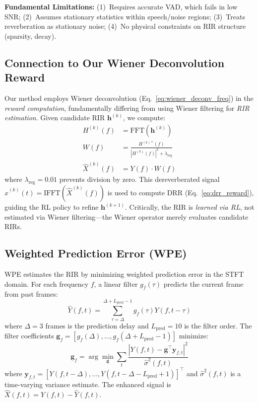\documentclass[12pt,a4paper]{article}
\begin{document}
\textbf{Fundamental Limitations:} (1)~Requires accurate VAD, which fails in low SNR; (2)~Assumes stationary statistics within speech/noise regions; (3)~Treats reverberation as stationary noise; (4)~No physical constraints on RIR structure (sparsity, decay).

\subsection{Connection to Our Wiener Deconvolution Reward}

Our method employs Wiener deconvolution (Eq.~\ref{eq:wiener_deconv_freq}) in the \textit{reward computation}, fundamentally differing from using Wiener filtering for \textit{RIR estimation}. Given candidate RIR $\mathbf{h}^{(k)}$, we compute:
\begin{align}
H^{(k)}(f) &= \text{FFT}(\mathbf{h}^{(k)}) \label{eq:rir_fft} \\
W(f) &= \frac{H^{(k)*}(f)}{|H^{(k)}(f)|^2 + \lambda_{\text{reg}}} \label{eq:wiener_deconv_freq} \\
\hat{X}^{(k)}(f) &= Y(f) \cdot W(f) \label{eq:derev_freq}
\end{align}
where $\lambda_{\text{reg}} = 0.01$ prevents division by zero. This dereverberated signal $\hat{x}^{(k)}(t) = \text{IFFT}(\hat{X}^{(k)}(f))$ is used to compute DRR (Eq.~\ref{eq:drr_reward}), guiding the RL policy to refine $\mathbf{h}^{(k+1)}$. Critically, the RIR is \textit{learned via RL}, not estimated via Wiener filtering—the Wiener operator merely evaluates candidate RIRs.

\subsection{Weighted Prediction Error (WPE)}

WPE \cite{nakatani2010speech} estimates the RIR by minimizing weighted prediction error in the STFT domain. For each frequency $f$, a linear filter $g_f(\tau)$ predicts the current frame from past frames:
\begin{equation}
\hat{Y}(f,t) = \sum_{\tau=\Delta}^{\Delta+L_{\text{pred}}-1} g_f(\tau) Y(f, t-\tau)
\label{eq:wpe_prediction}
\end{equation}
where $\Delta = 3$ frames is the prediction delay and $L_{\text{pred}} = 10$ is the filter order. The filter coefficients $\mathbf{g}_f = [g_f(\Delta), \ldots, g_f(\Delta+L_{\text{pred}}-1)]$ minimize:
\begin{equation}
\mathbf{g}_f = \arg\min_{\mathbf{g}} \sum_{t} \frac{|Y(f,t) - \mathbf{g}^\top \mathbf{y}_{f,t}|^2}{\hat{\sigma}^2(f,t)}
\label{eq:wpe_objective}
\end{equation}
where $\mathbf{y}_{f,t} = [Y(f,t-\Delta), \ldots, Y(f,t-\Delta-L_{\text{pred}}+1)]^\top$ and $\hat{\sigma}^2(f,t)$ is a time-varying variance estimate. The enhanced signal is $\hat{X}(f,t) = Y(f,t) - \hat{Y}(f,t)$.
\end{document}
